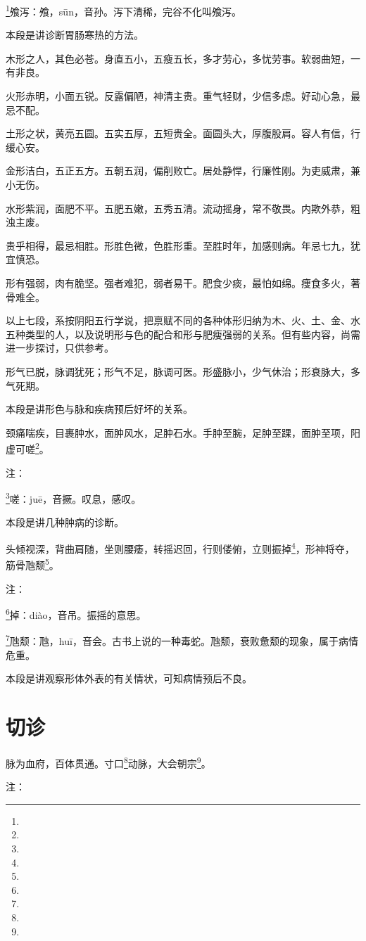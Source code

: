 \documentclass[a4paper,12pt,UTF8,twoside]{ctexbook}
\begin{document}
\footnote{}飧泻：飧，sūn，音孙。泻下清稀，完谷不化叫飧泻。

本段是讲诊断胃肠寒热的方法。

木形之人，其色必苍。身直五小，五瘦五长，多才劳心，多忧劳事。软弱曲短，一有非良。

火形赤明，小面五锐。反露偏陋，神清主贵。重气轻财，少信多虑。好动心急，最忌不配。

土形之状，黄亮五圆。五实五厚，五短贵全。面圆头大，厚腹股肩。容人有信，行缓心安。

金形洁白，五正五方。五朝五润，偏削败亡。居处静悍，行廉性刚。为吏威肃，兼小无伤。

水形紫润，面肥不平。五肥五嫩，五秀五清。流动摇身，常不敬畏。内欺外恭，粗浊主废。

贵乎相得，最忌相胜。形胜色微，色胜形重。至胜时年，加感则病。年忌七九，犹宜慎恐。

形有强弱，肉有脆坚。强者难犯，弱者易干。肥食少痰，最怕如绵。痩食多火，著骨难全。

以上七段，系按阴阳五行学说，把禀赋不同的各种体形归纳为木、火、土、金、水五种类型的人，以及说明形与色的配合和形与肥瘦强弱的关系。但有些内容，尚需进一步探讨，只供参考。

形气已脱，脉调犹死；形气不足，脉调可医。形盛脉小，少气休治；形衰脉大，多气死期。

本段是讲形色与脉和疾病预后好坏的关系。

颈痛喘疾，目裹肿水，面肿风水，足肿石水。手肿至腕，足肿至踝，面肿至项，阳虚可嗟\footnote{}。

注：

\footnote{}嗟：juē，音撅。叹息，感叹。

本段是讲几种肿病的诊断。

头倾视深，背曲肩随，坐则腰痿，转摇迟回，行则偻俯，立则振掉\footnote{}，形神将夺，筋骨虺颓\footnote{}。

注：

\footnote{}掉：diào，音吊。振摇的意思。

\footnote{}虺颓：虺，huī，音会。古书上说的一种毒蛇。虺颓，衰败惫颓的现象，属于病情危重。

本段是讲观察形体外表的有关情状，可知病情预后不良。

\section{切诊}

脉为血府，百体贯通。寸口\footnote{}动脉，大会朝宗\footnote{}。

注：
\end{document}
